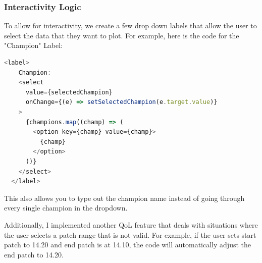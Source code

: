 \documentclass{article}
\begin{document}
\subsubsection{Interactivity Logic}
\label{subsubsec:Visualization Logic}

To allow for interactivity, we create a few drop down labels that allow the user
to select the data that they want to plot. For example, here is the code
for the "Champion" Label:

\begin{lstlisting}[language=JavaScript]
  <label>
    Champion:
    <select
      value={selectedChampion}
      onChange={(e) => setSelectedChampion(e.target.value)}
    >
      {champions.map((champ) => (
        <option key={champ} value={champ}>
          {champ}
        </option>
      ))}
    </select>
  </label>
\end{lstlisting}

This also allows you to type out the champion name 
instead of going through every single champion in the dropdown.

Additionally, I implemented another QoL feature that deals with situations
where the user selects a patch range that is not valid. 
For example, if the user sets start patch to 14.20 and end patch is at 14.10,
the code will automatically adjust the end patch to 14.20.

\begin{refcontext}[sorting=nyt]
\printbibliography
\end{refcontext}
\end{document}

